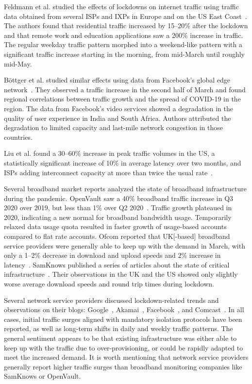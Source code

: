 \documentclass[conference,10pt]{IEEEtran}
\begin{document}
Feldmann et al. studied the effects of lockdowns on internet traffic using traffic data obtained from several \glspl{ISP} and \glspl{IXP} in Europe and on the \gls{US} East Coast~\cite{feldmann2020lockdown}. The authors found that residential traffic increased by 15--20\% after the lockdown and that remote work and education applications saw a 200\% increase in traffic. The regular weekday traffic pattern morphed into a weekend-like pattern with a significant traffic increase starting in the morning, from mid-March until roughly mid-May.

B\"{o}ttger et al. studied similar effects using data from Facebook's global edge network~\cite{bottger2020internet}. They observed a traffic increase in the second half of March and found regional correlations between traffic growth and the spread of COVID-19 in the region. The data from Facebook's video services showed a degradation in the quality of user experience in India and South Africa. Authors attributed the degradation to limited capacity and last-mile network congestion in those countries.

Liu et al. found a 30--60\% increase in peak traffic volumes in the \gls{US}, a statistically significant increase of 10\% in average latency over two months, and \glspl{ISP} adding interconnect capacity at more than twice the usual rate~\cite{liu2020characterizing}.

Several broadband market reports analyzed the state of broadband infrastructure during the pandemic. OpenVault saw a 40\% broadband traffic increase in Q3 2020 over 2019, but less than 1\% over Q2 2020~\cite{openvault}. Traffic growth plateaued in 2020, indicating a new normal for broadband bandwidth usage. Temporarily relaxed data usage quota resulted in faster growth of usage-based accounts compared to flat rate accounts. Ofcom reported that \gls{UK}[-based] broadband service providers were generally able to keep up with the demand in March, with only a 1--2\% decrease in download and upload speeds and 2\% increase in latency~\cite{uk-home-broadband-performance}. SamKnows published a series of articles about the state of critical infrastructure~\cite{samknows-cdn,samknows-video-streaming,samknows-video-conferencing,samknows-usa}. Their observations in the \gls{UK} and the \gls{US} showed only slightly worse average download speeds and round trip times during lockdown.

Several network service providers discussed lockdown-related trends and observations on their blogs: Google~\cite{google}, Akamai~\cite{akamai}, Facebook~\cite{facebook}, and Comcast~\cite{comcast}. In all cases, initial traffic surges aligned with mandatory isolation protocols have been reported, as well as long-term shifts in daily and weekly traffic patterns. The general sentiment appears to be that existing infrastructure was either able to keep up with the traffic due to over-provisioning, or could be rapidly adapted to meet the increased demand. It is worth mentioning that network service providers generally report higher traffic surges than broadband monitoring companies like SamKnows or OpenVault.
\end{document}
